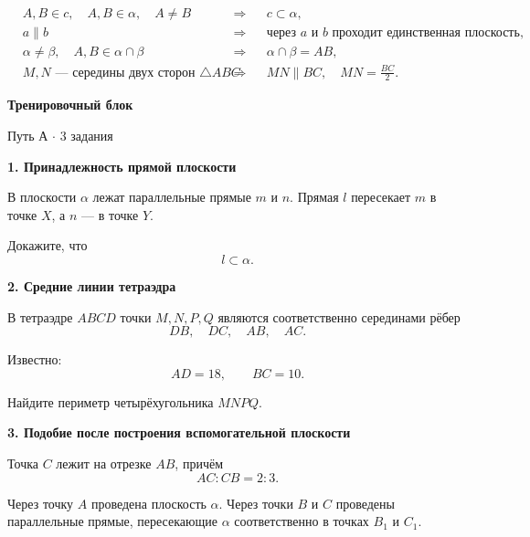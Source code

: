 \documentclass[a4paper,12pt]{article}
\begin{document}
\[
\begin{aligned}
&A,B\in c,\quad A,B\in\alpha,\quad A\ne B
&&\Longrightarrow&& c\subset\alpha,\\[2mm]
&a\parallel b
&&\Longrightarrow&&
\text{через }a\text{ и }b\text{ проходит единственная плоскость},\\[2mm]
&\alpha\ne\beta,\quad A,B\in\alpha\cap\beta
&&\Longrightarrow&&
\alpha\cap\beta=AB,\\[2mm]
&M,N\text{ --- середины двух сторон }\triangle ABC
&&\Longrightarrow&&
MN\parallel BC,\quad MN=\frac{BC}{2}.
\end{aligned}
\]

\clearpage
\thispagestyle{plain}

\begin{center}
{\LARGE\bfseries\color{darkaccent}Тренировочный блок}

\vspace{2mm}

{\large Путь А $\cdot$ 3 задания}
\end{center}

\vspace{7mm}

\textbf{\color{darkaccent}1. Принадлежность прямой плоскости}

В плоскости \(\alpha\) лежат параллельные прямые \(m\) и \(n\).
Прямая \(l\) пересекает \(m\) в точке \(X\), а \(n\) --- в точке \(Y\).

Докажите, что
\[
l\subset\alpha.
\]

\vspace{11mm}

\textbf{\color{darkaccent}2. Средние линии тетраэдра}

В тетраэдре \(ABCD\) точки \(M,N,P,Q\) являются соответственно серединами
рёбер
\[
DB,\quad DC,\quad AB,\quad AC.
\]

Известно:
\[
AD=18,\qquad BC=10.
\]

Найдите периметр четырёхугольника \(MNPQ\).

\vspace{11mm}

\textbf{\color{darkaccent}3. Подобие после построения вспомогательной плоскости}

Точка \(C\) лежит на отрезке \(AB\), причём
\[
AC:CB=2:3.
\]

Через точку \(A\) проведена плоскость \(\alpha\).
Через точки \(B\) и \(C\) проведены параллельные прямые, пересекающие
\(\alpha\) соответственно в точках \(B_1\) и \(C_1\).
\end{document}
